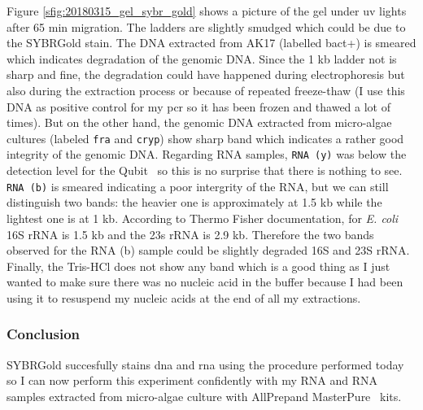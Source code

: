Figure \ref{sfig:20180315_gel_sybr_gold} shows a picture of the gel under \gls{uv} lights after 65 min migration. The ladders are slightly smudged which could be due to the SYBR\cR Gold stain.  The DNA extracted from AK17 (labelled bact+) is smeared which indicates degradation of the genomic DNA. Since the 1 kb ladder not is sharp and fine, the degradation could have happened during electrophoresis but also during the extraction process or because of repeated freeze-thaw (I use this DNA as positive control for my \gls{pcr} so it has been frozen and thawed a lot of times).  But on the other hand, the genomic DNA extracted from micro-algae cultures (labeled \texttt{fra} and \texttt{cryp}) show sharp band which indicates a rather good integrity of the genomic DNA. Regarding RNA samples, \texttt{RNA (y)} was below the detection level for the Qubit\texttrademark~ so this is no surprise that there is nothing to see. \texttt{RNA (b)} is smeared indicating a poor intergrity of the RNA, but we can still distinguish two bands: the heavier one is approximately at 1.5 kb while the lightest one is at 1 kb. According to Thermo Fisher documentation, for \textit{E. coli} 16S rRNA is 1.5 kb and the 23s rRNA is 2.9 kb. Therefore the two bands observed for the RNA (b) sample could be slightly degraded 16S and 23S rRNA. Finally, the Tris-HCl does not show any band which is a good thing as I just wanted to make sure there was no nucleic acid in the buffer because I had been using it to resuspend my nucleic acids at the end of all my extractions. 

\subsubsection{Conclusion}

SYBR\cR Gold succesfully stains \gls{dna} and \gls{rna} using the procedure performed today so I can now perform this experiment confidently with my RNA and RNA samples extracted from micro-algae culture with AllPrep\cR and MasterPure\texttrademark~ kits.


